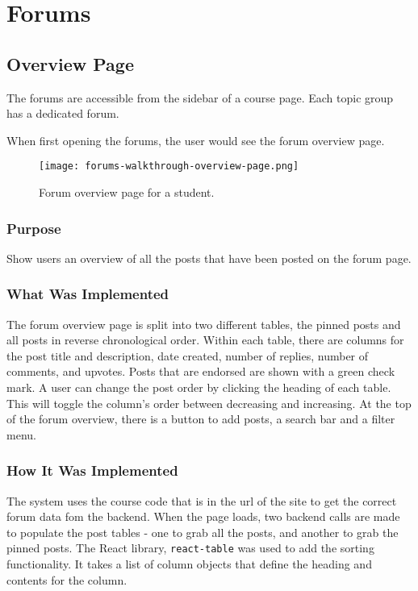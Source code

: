 \newpage
\section{Forums}

\newpage

\subsection{Overview Page}
The forums are accessible from the sidebar of a course page. Each topic group has a dedicated forum.

When first opening the forums, the user would see the forum overview page.

\begin{figure}[h!]
    \texttt{[image: forums-walkthrough-overview-page.png]}
    \centering
    \caption{Forum overview page for a student.}
\end{figure}

\subsubsection{Purpose}
Show users an overview of all the posts that have been posted on the forum page.

\subsubsection{What Was Implemented}
The forum overview page is split into two different tables, the pinned posts and all posts in reverse chronological order.
Within each table, there are columns for the post title and description, date created, number of replies, number of comments, and upvotes.
Posts that are endorsed are shown with a green check mark.
A user can change the post order by clicking the heading of each table. This will toggle the column's order between decreasing and increasing.
At the top of the forum overview, there is a button to add posts, a search bar and a filter menu.

\subsubsection{How It Was Implemented}
The system uses the course code that is in the url of the site to get the correct forum data fom the backend.
When the page loads, two backend calls are made to populate the post tables - one to grab all the posts, and another to grab the pinned posts.
The React library, \texttt{react-table} was used to add the sorting functionality.
It takes a list of column objects that define the heading and contents for the column.

